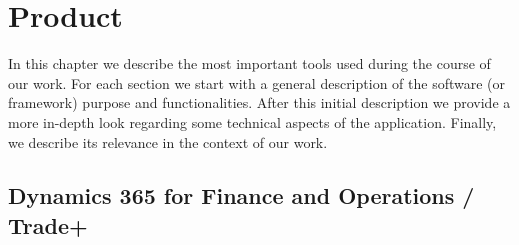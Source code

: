\chapter{Product}

In this chapter we describe the most important tools used during the course of our work. For each section we start with a general description of the software (or framework) purpose and functionalities. After this initial description we provide a more in-depth look regarding some technical aspects of the application. Finally, we describe its relevance in the context of our work.

\section{Dynamics 365 for Finance and Operations / Trade+} 

